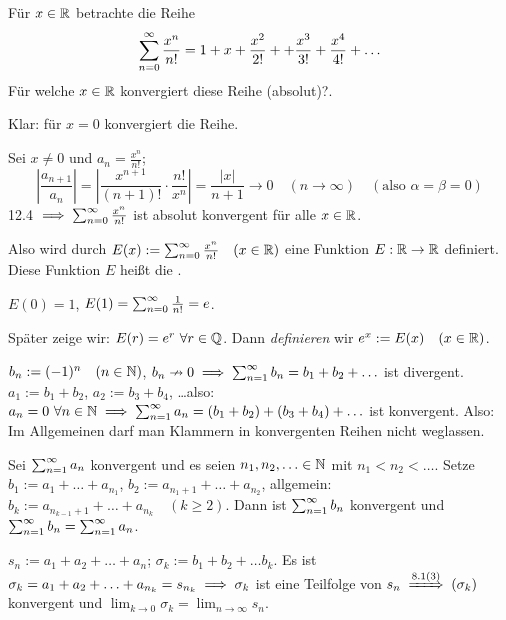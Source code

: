 \documentclass[a4paper,twoside,DIV15,BCOR12mm]{scrbook}
\begin{document}
\begin{wichtigesbeispiel}[Exponentialfunktion]
Für $x\in\mathbb{R}$ betrachte die Reihe
$$\sum_{n=0}^{\infty}{\frac{x^n}{n!}} = 1 + x + \frac{x^2}{2!} + +\frac{x^3}{3!} + \frac{x^4}{4!} + \ldots$$
Für welche $x\in\mathbb{R}$ konvergiert diese Reihe (absolut)?.

Klar: für $x=0$ konvergiert die Reihe.

Sei $x\ne0$ und $a_n=\frac{x^n}{n!}$;
$$\left|\frac{a_{n+1}}{a_n}\right| = \left| \frac{x^{n+1}}{(n+1)!} \cdot \frac{n!}{x^n}\right| = \frac{|x|}{n+1} \to 0 \quad (n\to\infty) \quad (\text{also } \alpha = \beta = 0)$$
12.4 $\implies \sum_{n=0}^{\infty}{\frac{x^n}{n!}}$ ist absolut konvergent für alle $x\in\mathbb{R}$.

Also wird durch $E(x) := \sum_{n=0}^{\infty}{\frac{x^n}{n!}} \quad (x\in\mathbb{R})$ eine Funktion $E: \mathbb{R} \to \mathbb{R}$ definiert. Diese Funktion $E$ heißt die .

$E(0) = 1$, $E(1)=\sum_{n=0}^{\infty}{\frac{1}{n!}} = e$.

\begin{bemerkung}
Später zeige wir: $E(r) = e^r \ \forall r\in\mathbb{Q}$. Dann \textit{definieren} wir $e^x := E(x) \quad (x\in\mathbb{R})$.
\end{bemerkung}
\end{wichtigesbeispiel}

\begin{motivation}
$b_n := (-1)^n \quad (n\in\mathbb{N})$, $b_n \nrightarrow 0 \implies \sum_{n=1}^{\infty}{b_n}=b_1 + b_2 + \ldots$ ist divergent. \\
$a_1 := b_1 + b_2$, $a_2 := b_3 + b_4$, \ldots also: $a_n = 0 \ \forall n\in\mathbb{N} \implies \sum_{n=1}^{\infty}{a_n} = (b_1+b_2) + (b_3+b_4) + \ldots$ ist konvergent. Also: \glqq Im Allgemeinen darf man Klammern in konvergenten Reihen nicht weglassen.\grqq
\end{motivation}

\begin{satz}

Sei $\sum_{n=1}^{\infty}{a_n}$ konvergent und es seien $n_1, n_2, \ldots \in\mathbb{N}$ mit $n_1<n_2<\ldots$. Setze $b_1 := a_1 + \ldots + a_{n_1}$, $b_2 := a_{n_1+1} + \ldots + a_{n_2}$, allgemein: $b_k := a_{n_{k-1}+1} + \ldots + a_{n_k} \quad (k\ge2)$. Dann ist $\sum_{n=1}^{\infty}{b_n}$ konvergent und $\sum_{n=1}^{\infty}{b_n} = \sum_{n=1}^{\infty}{a_n}$.
\end{satz}

\begin{beweis}
$s_n := a_1 + a_2 + \ldots + a_n$; $\sigma_k := b_1 + b_2 + \ldots b_k$. Es ist $\sigma_k = a_1 + a_2 + \ldots + a_{n_k} = s_{n_k} \implies \sigma_k$ ist eine Teilfolge von $s_n \folgtnach{8.1(3)} (\sigma_k)$ konvergent und $\lim_{k\to0}\sigma_k=\lim_{n\to\infty}s_n$.
\end{beweis}
\end{document}
